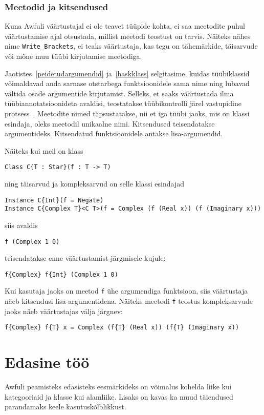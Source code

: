 \documentclass[12pt]{article}
\newcommand\peatykk[1]{
  \clearpage
  \section{#1}}
\begin{document}
      \subsubsection{Meetodid ja kitsendused}
        Kuna Awfuli väärtustajal ei ole teavet tüüpide kohta, ei saa meetodite puhul väärtustamise ajal otsustada, millist meetodi teostust on tarvis. Näiteks nähes nime \verb!Write_Brackets!, ei teaks väärtustaja, kas tegu on tähemärkide, täisarvude või mõne muu tüübi kirjutamise meetodiga.

        Jaotistes~\ref{peidetudargumendid} ja~\ref{haskklass} selgitasime, kuidas tüübiklassid võimaldavad anda sarnase otstarbega funktsioonidele sama nime ning lubavad vältida osade argumentide kirjutamist. Selleks, et saaks väärtustada ilma tüübiannotatsioonideta avaldisi, teostatakse tüübikontrolli järel vastupidine protsess~\cite{How}. Meetodite nimed täpsustatakse, nii et iga tüübi jaoks, mis on klassi esindaja, oleks meetodil unikaalne nimi. Kitsendused teisendatakse argumentideks. Kitsendatud funktsioonidele antakse lisa-argumendid.

        Näiteks kui meil on klass

        \begin{verbatim}Class C{T : Star}(f : T -> T)\end{verbatim}

        ning täisarvud ja kompleksarvud on selle klassi esindajad

        \begin{verbatim}Instance C{Int}(f = Negate)
Instance C{Complex T}<C T>(f = Complex (f (Real x)) (f (Imaginary x)))\end{verbatim}

        siis avaldis

        \begin{verbatim}f (Complex 1 0)\end{verbatim}

        teisendatakse enne väärtustamist järgmisele kujule:

        \begin{verbatim}f{Complex} f{Int} (Complex 1 0)\end{verbatim}

        Kui kasutaja jaoks on meetod \verb!f! ühe argumendiga funktsioon, siis väärtustaja näeb kitsendusi lisa-argumentidena. Näiteks meetodi \verb!f! teostus kompleksarvude jaoks näeb väärtustajas välja järgnev:

        \begin{verbatim}f{Complex} f{T} x = Complex (f{T} (Real x)) (f{T} (Imaginary x))\end{verbatim}
  \peatykk{Edasine töö}
    Awfuli peamisteks edasisteks eesmärkideks on võimalus kohelda liike kui kategooriaid ja klasse kui alamliike. Lisaks on kavas ka muud täiendused parandamaks keele kasutuskõlblikkust.
\end{document}
